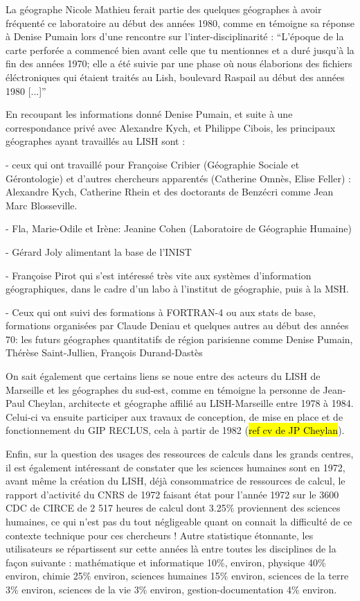 La géographe Nicole Mathieu ferait partie des quelques géographes à avoir fréquenté ce laboratoire au début des années 1980, comme en témoigne sa réponse à Denise Pumain lors d'une rencontre sur l'inter-disciplinarité : \enquote{L'époque de la carte perforée a commencé bien avant celle que tu mentionnes et a duré jusqu'à la fin des années 1970; elle a été suivie par une phase où nous élaborions des fichiers éléctroniques qui étaient traités au Lish, boulevard Raspail au début des années 1980 [...]} \autocite[154]{Mathieu2014}

En recoupant les informations donné Denise Pumain, et suite à une correspondance privé avec Alexandre Kych, et Philippe Cibois, les principaux géographes ayant travaillés au LISH sont :

- ceux qui ont travaillé pour Françoise Cribier (Géographie Sociale et Gérontologie) et d'autres chercheurs apparentés (Catherine Omnès, Elise Feller) : Alexandre Kych, Catherine Rhein et des doctorants de Benzécri comme Jean Marc Blosseville.

- Fla, Marie-Odile et Irène: Jeanine Cohen (Laboratoire de Géographie Humaine)

- Gérard Joly alimentant la base de l'INIST

- Françoise Pirot qui s'est intéressé très vite aux systèmes d'information géographiques, dans le cadre d'un labo à l’institut de géographie, puis à la MSH.

- Ceux qui ont suivi des formations à FORTRAN-4 ou aux stats de base, formations organisées par Claude Deniau et quelques autres au début des années 70: les futurs géographes quantitatifs de région parisienne comme Denise Pumain, Thérèse Saint-Jullien, François Durand-Dastès

On sait également que certains liens se noue entre des acteurs du LISH de Marseille et les géographes du sud-est, comme en témoigne la personne de Jean-Paul Cheylan, architecte et géographe affilié au LISH-Marseille entre 1978 à 1984. Celui-ci va ensuite participer aux travaux de conception, de mise en place et de fonctionnement du GIP RECLUS, cela à partir de 1982 (\hl{ref cv de JP Cheylan}).

Enfin, sur la question des usages des ressources de calculs dans les grands centres, il est également intéressant de constater que les sciences humaines sont en 1972, avant même la création du LISH, déjà consommatrice de ressources de calcul, le rapport d’activité du CNRS de 1972 faisant état pour l’année 1972 sur le 3600 CDC de CIRCE de 2 517 heures de calcul dont 3.25\% proviennent des sciences humaines, ce qui n’est pas du tout négligeable quant on connait la difficulté de ce contexte technique pour ces chercheurs ! Autre statistique étonnante, les utilisateurs se répartissent sur cette années là entre toutes les disciplines  de la façon suivante : mathématique et informatique 10\%, environ, physique 40\% environ, chimie 25\% environ, sciences humaines 15\% environ, sciences de la terre 3\% environ, sciences de la vie 3\% environ, gestion-documentation 4\% environ.

